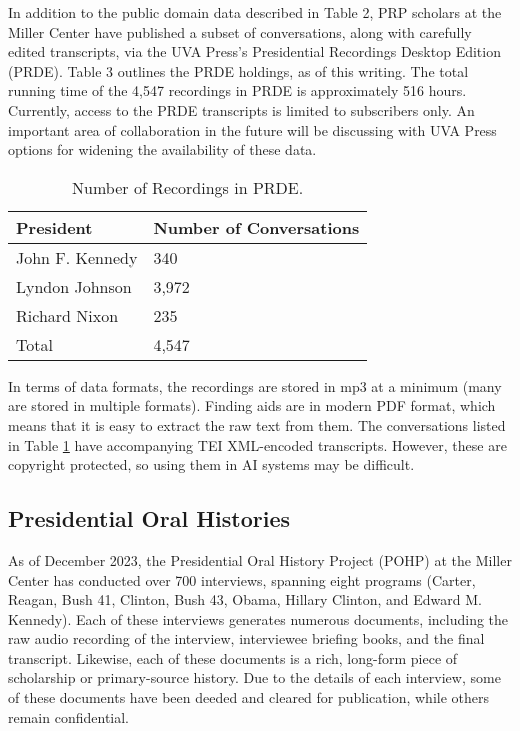 \documentclass[12pt, oneside]{article}   	%
\begin{document}
In addition to the public domain data described in Table 2, PRP scholars at the Miller Center have published a subset of conversations, along with carefully edited transcripts, via the UVA Press’s Presidential Recordings Desktop Edition (PRDE).  Table 3 outlines the PRDE holdings, as of this writing.  The total running time of the 4,547 recordings in PRDE is approximately 516 hours.  Currently, access to the PRDE transcripts is limited to subscribers only.  An important area of collaboration in the future will be discussing with UVA Press options for widening the availability of these data.

\begin{table}[htp]
\caption{Number of Recordings in PRDE.}
\begin{center}
\begin{tabular}{ p{1.75in} p{2in}}
\toprule
President				&	Number of Conversations		\\
\midrule
 John F. Kennedy	 	& 	340 				\\
\midrule
 Lyndon Johnson	 	& 	3,972 				\\
\midrule
 Richard Nixon		 	& 	235			 \\
\bottomrule
Total					&	4,547		\\
\bottomrule
\end{tabular}
\end{center}
\label{table.data.prde}
\end{table}%

In terms of data formats, the recordings are stored in mp3 at a minimum (many are stored in multiple formats).  Finding aids are in modern PDF format, which means that it is easy to extract the raw text from them.  The conversations listed in Table \ref{table.data.prde} have accompanying TEI XML-encoded transcripts.  However, these are copyright protected, so using them in AI systems may be difficult.   

\subsection{Presidential Oral Histories}\label{section.data.pohp}
As of December 2023, the Presidential Oral History Project (POHP) at the Miller Center has conducted over 700 interviews, spanning eight programs (Carter, Reagan, Bush 41, Clinton, Bush 43, Obama, Hillary Clinton, and Edward M. Kennedy).  Each of these interviews generates numerous documents, including the raw audio recording of the interview, interviewee briefing books, and the final transcript.  Likewise, each of these documents is a rich, long-form piece of scholarship or primary-source history.  Due to the details of each interview, some of these documents have been deeded and cleared for publication, while others remain confidential.  
\end{document}
